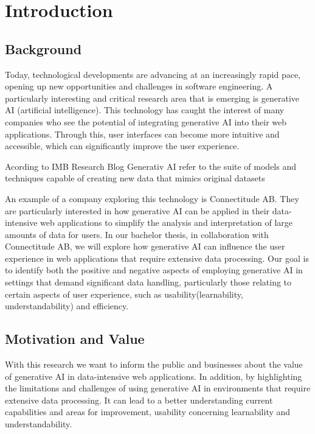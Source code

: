 \chapter{Introduction}
\label{chp:introduction}  %

\section{Background}
Today, technological developments are advancing at an increasingly rapid pace, opening up new opportunities and challenges in software engineering. A particularly interesting and critical research area that is emerging is generative AI (artificial intelligence). This technology has caught the interest of many companies who see the potential of integrating generative AI into their web applications. Through this, user interfaces can become more intuitive and accessible, which can significantly improve the user experience.

Acording to IMB Research Blog \cite{ibmGenerativeAI} Generativ AI refer to the suite of models and techniques capable of creating new data that mimics original datasets

An example of a company exploring this technology is Connectitude AB. They are particularly interested in how generative AI can be applied in their data-intensive web applications to simplify the analysis and interpretation of large amounts of data for users. In our bachelor thesis, in collaboration with Connectitude AB, we will explore how generative AI can influence the user experience in web applications that require extensive data processing. Our goal is to identify both the positive and negative aspects of employing generative AI in settings that demand significant data handling, particularly those relating to certain aspects of user experience, such as usability(learnability, understandability) and efficiency.

\section{Motivation and Value}
With this research we want to inform the public and businesses about the value of generative AI in data-intensive web applications. In addition, by highlighting the limitations and challenges of using generative AI in environments that require extensive data processing. It can lead to a better understanding current capabilities and areas for improvement, usability concerning learnability and understandability.

